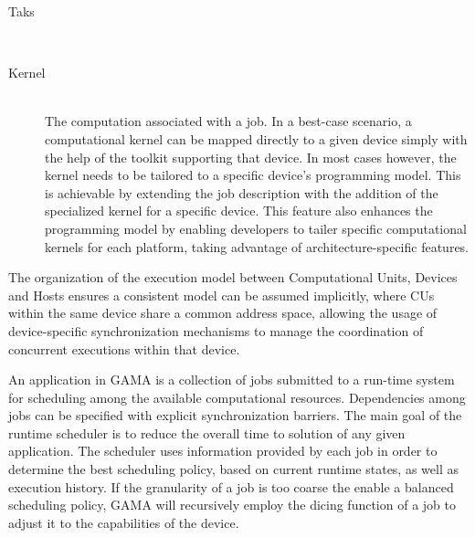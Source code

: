 \documentclass[main.tex]{subfiles}
\begin{document}
\begin{description}
  \item[Taks] \hfill \\

  \item[Kernel] \hfill \\
    The computation associated with a job. In a best-case scenario, a computational kernel can be mapped directly to a given device simply with the help of the toolkit supporting that device. In most cases however, the kernel needs to be tailored to a specific device's programming model. This is achievable by extending the job description with the addition of the specialized kernel for a specific device. This feature also enhances the programming model by enabling developers to tailer specific computational kernels for each platform, taking advantage of architecture-specific features.


\end{description}

The organization of the execution model between Computational Units, Devices and Hosts ensures a consistent model can be assumed implicitly, where \acsp{CU} within the same device share a common address space, allowing the usage of device-specific synchronization mechanisms to manage the coordination of concurrent executions within that device.

An application in GAMA is a collection of jobs submitted to a run-time system for scheduling among the available computational resources. Dependencies among jobs can be specified with explicit synchronization barriers. The main goal of the runtime scheduler is to reduce the overall time to solution of any given application. The scheduler uses information provided by each job in order to determine the best scheduling policy, based on current runtime states, as well as execution history. If the granularity of a job is too coarse the enable a balanced scheduling policy, \ac{GAMA} will recursively employ the dicing function of a job to adjust it to the capabilities of the device.
\end{document}
